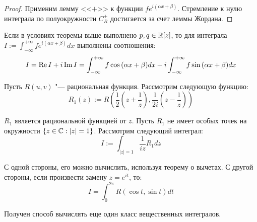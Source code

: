 \begin{proof}
	Применим лемму <<$+$>> к функции $fe^{i(\alpha x + \beta)}$. Стремление к нулю интеграла по полуокружности $C_R^+$ достигается за счет леммы Жордана.
\end{proof}

\begin{note}
	Если в условиях теоремы выше выполнено $p, q \in \mathbb{R}[z]$, то для интеграла $I := \int_{-\infty}^{+\infty}fe^{i(\alpha x + \beta)}dx$ выполнены соотношения:
	\[I = \operatorname{Re} I + i \operatorname{Im} I = \int_{-\infty}^{+\infty}f\cos{(\alpha x + \beta)}dx + i\int_{-\infty}^{+\infty}f\sin{(\alpha x + \beta)}dx\]
\end{note}

\begin{note}
	Пусть $R(u, v)$ "--- рациональная функция. Рассмотрим следующую функцию:
	\[R_1(z) := R\left(\frac12\left(z + \frac1z\right), \frac1{2i}\left(z - \frac1z\right)\right)\]
	
	$R_1$ является рациональной функцией от $z$. Пусть $R_1$ не имеет особых точек на окружности $\{z \in \mathbb{C} : |z| = 1\}$. Рассмотрим следующий интеграл:
	\[I := \int_{|z| = 1}\frac{1}{iz}R_1dz\]
	
	С одной стороны, его можно вычислить, используя теорему о вычетах. С другой стороны, если произвести замену $z = e^{it}$, то:
	\[I = \int_{0}^{2\pi} R(\cos{t}, \sin{t})dt\]
	
	Получен способ вычислять еще один класс вещественных интегралов.
\end{note}